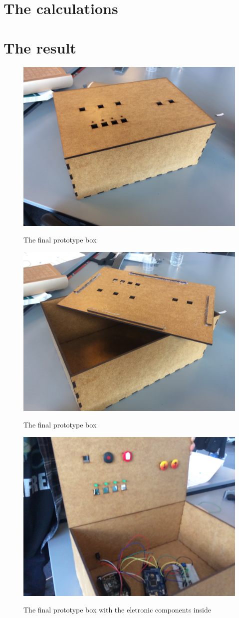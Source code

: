 \section{The calculations}

\section{The result}


\begin{figure}[H]
	\centering
	\includegraphics[width=0.7\linewidth]{figure/Design/finalbox1}
	\label{fig:finalbox1}
	\caption{The final prototype box}
	
\end{figure}

\begin{figure}[H]
	\centering
	\includegraphics[width=0.7\linewidth]{figure/Design/finalbox2}
	\label{fig:finalbox2}
	\caption{The final prototype box}
	
\end{figure}

\begin{figure}[H]
	\centering
	\includegraphics[width=0.7\linewidth]{figure/Design/finalbox3}
	\label{fig:finalbox3}
	\caption{The final prototype box with the eletronic components inside}
	
\end{figure}






